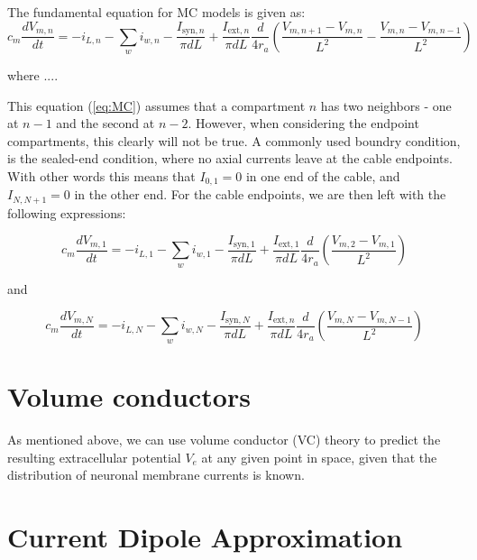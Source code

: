 \documentclass[a4paper, UKenglish, 11pt]{uiomaster}
\begin{document}
The fundamental equation for MC models is given as:
\begin{equation}
  c_m\frac{dV_{m,n}}{dt} = - i_{L,n} - \sum_w i_{w,n} - \frac{I_{\text{syn},n}}{\pi dL} + \frac{I_{\text{ext},n}}{\pi dL} \frac{d}{4r_a}\left( \frac{V_{m,n+1} - V_{m,n}}{L^2} - \frac{V_{m,n} - V_{m,n-1}}{L^2} \right )
\label{eq:MC}
\end{equation}

where ....

This equation (\ref{eq:MC}) assumes that a compartment $n$ has two neighbors - one at $n - 1$ and the second at $n - 2$. However, when considering the endpoint compartments, this clearly will not be true. A commonly used boundry condition, is the sealed-end condition, where no axial currents leave at the cable endpoints. With other words this means that $I_{0,1} = 0$ in one end of the cable, and $I_{N,N+1} = 0$ in the other end. For the cable endpoints, we are then left with the following expressions:

\begin{equation}
  c_m\frac{dV_{m,1}}{dt} = - i_{L,1} - \sum_w i_{w,1} - \frac{I_{\text{syn},1}}{\pi dL} + \frac{I_{\text{ext},1}}{\pi dL} \frac{d}{4r_a}\left( \frac{V_{m,2} - V_{m,1}}{L^2} \right )
\label{eq:MC_end1}
\end{equation}

and

\begin{equation}
  c_m\frac{dV_{m,N}}{dt} = - i_{L,N} - \sum_w i_{w,N} - \frac{I_{\text{syn},N}}{\pi dL} + \frac{I_{\text{ext},n}}{\pi dL} \frac{d}{4r_a}\left( \frac{V_{m,N} - V_{m,N-1}}{L^2} \right )
\label{eq:MC_end2}
\end{equation}


\section{Volume conductors}
As mentioned above, we can use volume conductor (VC) theory to predict the resulting extracellular potential $V_e$ at any given point in space, given that the distribution of neuronal membrane currents is known.


\section{Current Dipole Approximation}
\end{document}
